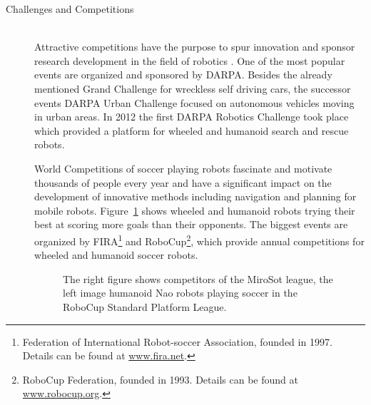 \begin{description}
\item[Challenges and Competitions]\hfill \\
Attractive competitions have the purpose to spur innovation and sponsor research development in the field of robotics .  
One of the most popular events are organized and sponsored by DARPA. Besides the already mentioned Grand Challenge for wreckless self driving cars, the successor events DARPA Urban Challenge focused on autonomous vehicles moving in urban areas. 
In 2012 the first DARPA Robotics Challenge took place which provided a platform for wheeled and humanoid search and rescue robots.

World Competitions of soccer playing robots fascinate and motivate thousands of people every year and have a significant impact on the development of innovative methods including navigation and planning for mobile robots.
Figure~\ref{fig:fig_competition} shows wheeled and humanoid robots trying their best at scoring more goals than their opponents.
The biggest events are organized by FIRA\footnote{Federation of International Robot-soccer Association, founded in 1997. Details can be found at \url{www.fira.net}.} and RoboCup\footnote{RoboCup Federation, founded in 1993. Details can be found at \url{www.robocup.org}.}, which provide annual competitions for wheeled and humanoid soccer robots.

\begin{figure}[thpb]
	  \myfloatalign
      \footnotesize
      \centering
   \caption[Soccer robots]{The right figure shows competitors of the MiroSot league, the left image humanoid Nao robots playing soccer in the RoboCup Standard Platform League.}
   \label{fig:fig_competition}
\end{figure}
\end{description}

